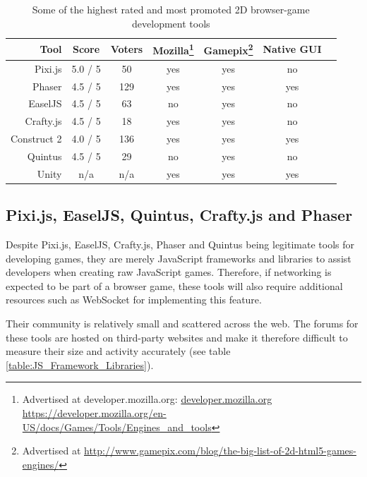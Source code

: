 \documentclass[bsc,frontabs,twoside,singlespacing,parskip,deptreport]{infthesis}     %
\begin{document}
\begin{savenotes}
\begin{table}
\centering
  \begin{tabular}{ | r || c | c | c | c | c | c | }
  	\hline
  	\textbf{Tool}			& \textbf{Score}		& \textbf{Voters}& \textbf{Mozilla}\footnote{Advertised at developer.mozilla.org: \url{developer.mozilla.org https://developer.mozilla.org/en-US/docs/Games/Tools/Engines\_and\_tools}} 	& \textbf{Gamepix}\footnote{Advertised at \url{http://www.gamepix.com/blog/the-big-list-of-2d-html5-games-engines/}} 	& \textbf{Native GUI}\\ \hline\hline
    Pixi.js			& 5.0 / 5	& 50	& yes	& yes	& no	\\ \hline
    Phaser			& 4.5 / 5	& 129	& yes	& yes	& yes	\\ \hline
    EaselJS			& 4.5 / 5	& 63	& no	& yes	& no	\\ \hline
    Crafty.js		& 4.5 / 5	& 18	& yes	& yes	& no	\\ \hline
    Construct 2		& 4.0 / 5	& 136	& yes	& yes	& yes	\\ \hline
   	Quintus			& 4.5 / 5	& 29	& no	& yes	& no	\\ \hline
  	Unity			& n/a		& n/a	& yes	& yes	& yes	\\ \hline
  \end{tabular}
  \caption{Some of the highest rated and most promoted 2D browser-game development tools}
  \label{table:Related_Tools}
\end{table}%
\end{savenotes}

\subsection{Pixi.js, EaselJS, Quintus, Crafty.js and Phaser}
Despite Pixi.js, EaselJS, Crafty.js, Phaser and Quintus being legitimate tools for developing games, they are merely JavaScript frameworks and libraries to assist developers when creating raw JavaScript games. Therefore, if networking is expected to be part of a browser game, these tools will also require additional resources such as WebSocket for implementing this feature.

Their community is relatively small and scattered across the web. The forums for these tools are hosted on third-party websites and make it therefore difficult to measure their size and activity accurately (see table \ref{table:JS_Framework_Libraries}).
\end{document}
